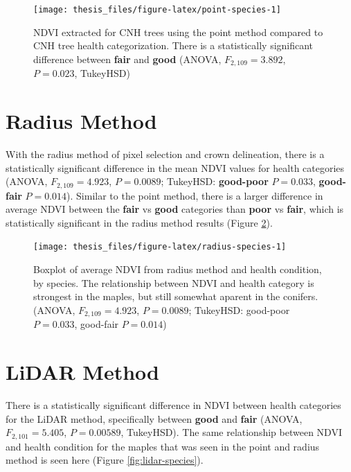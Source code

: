 \documentclass[12pt,twoside]{reedthesis}
\begin{document}
\begin{figure}

{\centering \texttt{[image: thesis\_files/figure-latex/point-species-1]} 

}

\caption[Point Method NDVI and Health Rating, by Species]{NDVI extracted for CNH trees using the point method compared to CNH tree health categorization. There is a statistically significant difference between \textbf{fair} and \textbf{good} (ANOVA, \(F_{2, 109} = 3.892\), \(P = 0.023\), TukeyHSD)}\label{fig:point-species}
\end{figure}
\hypertarget{radius-method-1}{%
\section{Radius Method}\label{radius-method-1}}

With the radius method of pixel selection and crown delineation, there is a statistically significant difference in the mean NDVI values for health categories (ANOVA, \(F_{2,109}=4.923\), \(P = 0.0089\); TukeyHSD: \textbf{good-poor} \(P = 0.033\), \textbf{good-fair} \(P = 0.014\)). Similar to the point method, there is a larger difference in average NDVI between the \textbf{fair} vs \textbf{good} categories than \textbf{poor} vs \textbf{fair}, which is statistically significant in the radius method results (Figure \ref{fig:radius-species}).
\begin{figure}

{\centering \texttt{[image: thesis\_files/figure-latex/radius-species-1]} 

}

\caption[Radius method mean NDVI and health condition by species]{Boxplot of average NDVI from radius method and health condition, by species. The relationship between NDVI and health category is strongest in the maples, but still somewhat aparent in the conifers. (ANOVA, $F_{2,109}=4.923$, $P = 0.0089$; TukeyHSD: good-poor $P = 0.033$, good-fair $P = 0.014$)}\label{fig:radius-species}
\end{figure}
\hypertarget{lidar-method-1}{%
\section{LiDAR Method}\label{lidar-method-1}}

There is a statistically significant difference in NDVI between health categories for the LiDAR method, specifically between \textbf{good} and \textbf{fair} (ANOVA, \(F_{2,101} = 5.405\), \(P = 0.00589\), TukeyHSD). The same relationship between NDVI and health condition for the maples that was seen in the point and radius method is seen here (Figure \ref{fig:lidar-species}).
\end{document}
